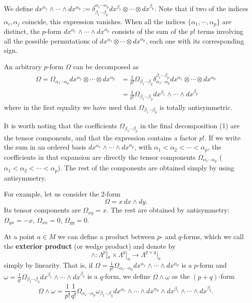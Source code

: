 \begin{points}
\item We define $dx^{\alpha_1}\wedge\cdots\wedge dx^{\alpha_p}:=\delta^{\alpha_1\cdots\alpha_p}_{\beta_1\cdots\beta_p}dx^{\beta_1}\otimes\cdots\otimes dx^{\beta_p}$. Note that if two of the indices $\alpha_i,\alpha_j$ coincide, this expression vanishes. When all the indices $\{\alpha_1,\cdots,\alpha_p\}$ are distinct, the $p$-form $dx^{\alpha_1}\wedge\cdots\wedge dx^{\alpha_p}$ consists of the sum of the $p!$ terms involving all the possible permutations of $dx^{\alpha_1}\otimes\cdots\otimes dx^{\alpha_p}$, each one with its corresponding sign.

\item An arbitrary $p$-form $\Omega$ can be decomposed as
\begin{align}
  \Omega=\Omega_{\alpha_1\cdots\alpha_p}dx^{\alpha_1}\otimes\cdots\otimes dx^{\alpha_p}&=\frac{1}{p!}\Omega_{\beta_1\cdots\beta_p}\delta^{\beta_1\cdots\beta_p}_{\alpha_1\cdots\alpha_p}dx^{\alpha_1}\otimes\cdots\otimes dx^{\alpha_p}\nonumber\\
  &=\frac{1}{p!}\Omega_{\beta_1\cdots\beta_p}dx^{\beta_1}\wedge\cdots\wedge dx^{\beta_p}
\end{align}
where in the first equality we have used that $\Omega_{\beta_1\cdots\beta_p}$ is totally antisymmetric.

\item It is worth noting that the coefficients $\Omega_{\beta_1\cdots\beta_p}$ in the final decomposition (1) are the tensor components, and that the expression contains a factor $p!$. If we write the sum in an ordered basis $dx^{\alpha_1}\wedge\cdots\wedge dx^{\alpha_p}$, with $\alpha_1<\alpha_2<\cdots<\alpha_p$, the coefficients in that expansion are directly the tensor components $\Omega_{\alpha_1\cdots\alpha_p}$ ($\alpha_1<\alpha_2<\cdots<\alpha_p$). The rest of the components are obtained simply by using antisymmetry.

\item For example, let us consider the 2-form
\[
  \Omega=x\,dx\wedge dy .
\]
Its tensor components are $\Omega_{xy}=x$. The rest are obtained by antisymmetry: $\Omega_{yx}=-x$, $\Omega_{xx}=0$, $\Omega_{yy}=0$.

\item At a point $a\in M$ we can define a product between $p$- and $q$-forms, which we call the \textbf{exterior product} (or wedge product) and denote by
\[
  \wedge:\Lambda^p|_a\times\Lambda^q|_a\longrightarrow\Lambda^{p+q}|_a
\]
simply by linearity. That is, if $\Omega=\frac{1}{p!}\Omega_{\alpha_1\cdots\alpha_p}dx^{\alpha_1}\wedge\cdots\wedge dx^{\alpha_p}$ is a $p$-form and $\omega=\frac{1}{q!}\Omega_{\beta_1\cdots\beta_q}dx^{\beta_1}\wedge\cdots\wedge dx^{\beta_q}$ is a $q$-form, we define $\Omega\wedge\omega$ as the $(p+q)$-form
\[
  \Omega\wedge\omega=\frac{1}{p!}\frac{1}{q!}\Omega_{\alpha_1\cdots\alpha_p}\omega_{\beta_1\cdots\beta_q}dx^{\alpha_1}\wedge\cdots\wedge dx^{\alpha_p}\wedge dx^{\beta_1}\wedge\cdots\wedge dx^{\beta_q}.
\]


\end{points}
